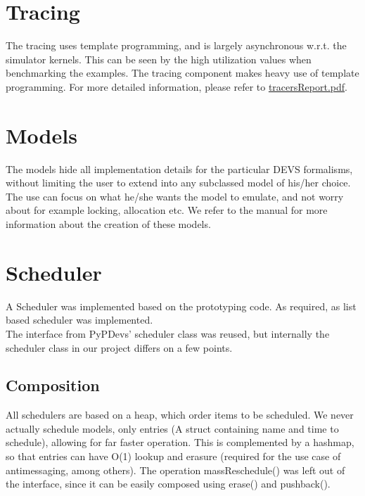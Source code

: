 \documentclass[8pt,a4paper]{report}
\begin{document}
\section{Tracing}
The tracing uses template programming, and is largely asynchronous w.r.t. the simulator kernels. This can be seen by the high utilization values when benchmarking the examples.
The tracing component makes heavy use of template programming. For more detailed information, please refer to \href{run:./tracersReport.pdf}{tracersReport.pdf}.

\section{Models}
The models hide all implementation details for the particular DEVS formalisms, without limiting the user to extend into any subclassed model of his/her choice. The use can focus on what he/she wants the model to emulate, and not worry about for example locking, allocation etc. We refer to the manual for more information about the creation of these models.

\section{Scheduler}
A Scheduler was implemented based on the prototyping code. As required, as list based scheduler was implemented. \\
The interface from PyPDevs' scheduler class was reused, but internally the scheduler class in our project differs on a few points. \\
\subsection{Composition}
All schedulers are based on a heap, which order items to be scheduled. We never actually schedule models, only entries (A struct containing name and time to schedule), allowing for far faster operation. This is complemented by a hashmap, so that entries can have O(1) lookup and erasure (required for the use case of antimessaging, among others). The operation massReschedule() was left out of the interface, since it can be easily composed using erase() and push\textunderscore back().
\\
\end{document}
